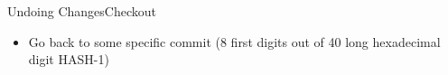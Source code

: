 \begin{frame}{Undoing Changes}{Checkout}
\begin{itemize}
\item Go back to some specific commit
 (8 first digits out of 40 long hexadecimal digit HASH-1)
\end{itemize}
\end{frame}
